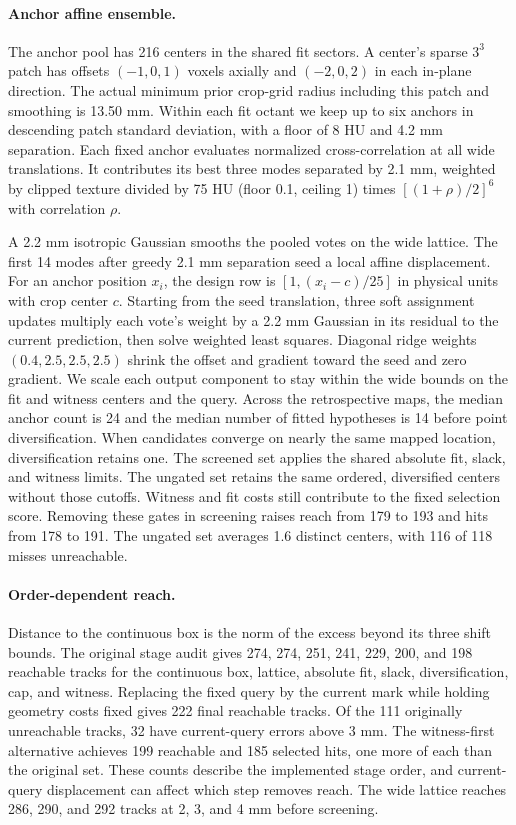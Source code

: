 \paragraph{Anchor affine ensemble.}
The anchor pool has 216 centers in the shared fit sectors. A center's sparse $3^3$ patch has offsets $(-1,0,1)$ voxels axially and $(-2,0,2)$ in each in-plane direction. The actual minimum prior crop-grid radius including this patch and smoothing is 13.50 mm. Within each fit octant we keep up to six anchors in descending patch standard deviation, with a floor of 8 HU and 4.2 mm separation. Each fixed anchor evaluates normalized cross-correlation at all wide translations. It contributes its best three modes separated by 2.1 mm, weighted by clipped texture divided by 75 HU (floor 0.1, ceiling 1) times $[(1+\rho)/2]^6$ with correlation $\rho$.

A 2.2 mm isotropic Gaussian smooths the pooled votes on the wide lattice. The first 14 modes after greedy 2.1 mm separation seed a local affine displacement. For an anchor position $x_i$, the design row is $[1,(x_i-c)/25]$ in physical units with crop center $c$. Starting from the seed translation, three soft assignment updates multiply each vote's weight by a 2.2 mm Gaussian in its residual to the current prediction, then solve weighted least squares. Diagonal ridge weights $(0.4,2.5,2.5,2.5)$ shrink the offset and gradient toward the seed and zero gradient. We scale each output component to stay within the wide bounds on the fit and witness centers and the query. Across the retrospective maps, the median anchor count is 24 and the median number of fitted hypotheses is 14 before point diversification. When candidates converge on nearly the same mapped location, diversification retains one. The screened set applies the shared absolute fit, slack, and witness limits. The ungated set retains the same ordered, diversified centers without those cutoffs. Witness and fit costs still contribute to the fixed selection score. Removing these gates in screening raises reach from 179 to 193 and hits from 178 to 191. The ungated set averages 1.6 distinct centers, with 116 of 118 misses unreachable.

\paragraph{Order-dependent reach.}
Distance to the continuous box is the norm of the excess beyond its three shift bounds. The original stage audit gives 274, 274, 251, 241, 229, 200, and 198 reachable tracks for the continuous box, lattice, absolute fit, slack, diversification, cap, and witness. Replacing the fixed query by the current mark while holding geometry costs fixed gives 222 final reachable tracks. Of the 111 originally unreachable tracks, 32 have current-query errors above 3 mm. The witness-first alternative achieves 199 reachable and 185 selected hits, one more of each than the original set. These counts describe the implemented stage order, and current-query displacement can affect which step removes reach. The wide lattice reaches 286, 290, and 292 tracks at 2, 3, and 4 mm before screening.

